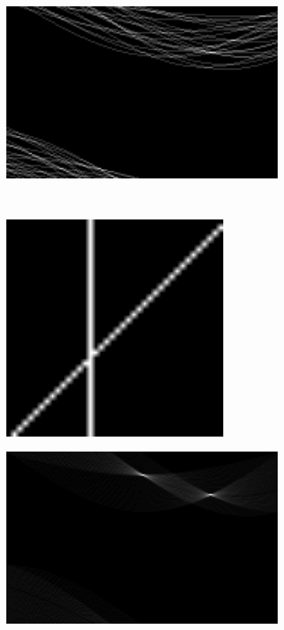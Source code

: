 \documentclass[12pt
,headinclude
,headsepline
,bibtotocnumbered
]{scrartcl}
\begin{document}
\begin{figure}[H]
\begin{subfigure}{0.45\textwidth}
    \end{subfigure}
    \hfill
    \begin{subfigure}{0.45\textwidth}
        \includegraphics[width=1.25\textwidth]{plots/test3_hough.png}
    \end{subfigure}\\
    \begin{subfigure}{0.45\textwidth}
        \includegraphics[width=0.8\textwidth]{plots/test4.png}
    \end{subfigure}
    \hfill
    \begin{subfigure}{0.45\textwidth}
        \includegraphics[width=1.25\textwidth]{plots/test4_hough.png}

\end{subfigure}
\end{figure}
\end{document}
